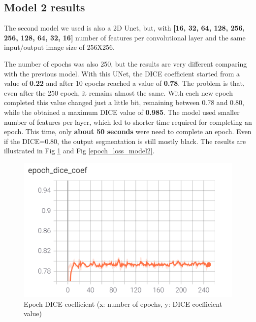 \documentclass[runningheads,a4paper,11pt]{report}
\begin{document}
\subsection{Model 2 results}
\label{section:unet2_results}

The second model we used is also a 2D Unet, but, with \textbf{[16, 32, 64, 128, 256, 256, 128, 64, 32, 16]} number of features per convolutional layer and the same input/output image size of 256X256.\par
The number of epochs was also 250, but the results are very different comparing with the previous model. With this UNet, the DICE coefficient started from a value of \textbf{0.22} and after 10 epochs reached a value of \textbf{0.78}. The problem is that, even after the 250 epoch, it remains almost the same. With each new epoch completed this value changed just a little bit, remaining between 0.78 and 0.80, while the \cite{deeplySupervisedCNN} obtained a maximum DICE value of \textbf{0.985}. The model used smaller number of features per layer, which led to shorter time required for completing an epoch. This time, only \textbf{about 50 seconds} were need to complete an epoch.
Even if the DICE=0.80, the output segmentation is still mostly black. The results are illustrated in Fig \ref{epoch_dice_coef_model2} and Fig \ref{epoch_loss_model2}.\par

\begin{figure}[!h]
	\centerline{\includegraphics{images/epoch_dice_coef_model2.PNG}}  
	\caption{Epoch DICE coefficient (x: number of epochs, y: DICE coefficient value)}
	\label{epoch_dice_coef_model2}
\end{figure}
\end{document}
